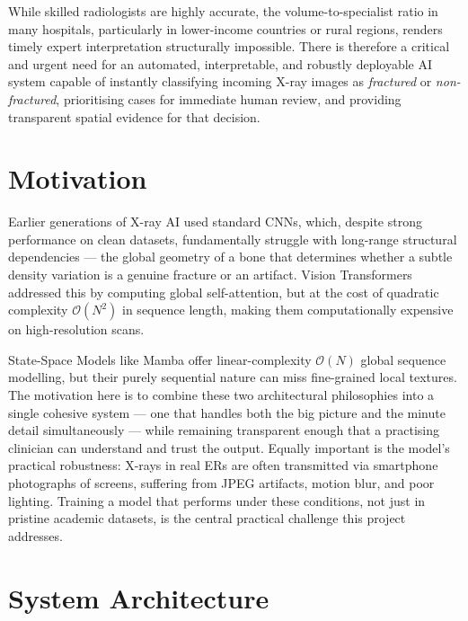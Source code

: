 \documentclass[12pt, a4paper]{article}
\begin{document}
While skilled radiologists are highly accurate, the volume-to-specialist ratio in many hospitals,
particularly in lower-income countries or rural regions, renders timely expert interpretation
structurally impossible. There is therefore a critical and urgent need for an automated,
interpretable, and robustly deployable AI system capable of instantly classifying incoming X-ray
images as \emph{fractured} or \emph{non-fractured}, prioritising cases for immediate human
review, and providing transparent spatial evidence for that decision.

\section{Motivation}

Earlier generations of X-ray AI used standard CNNs, which, despite strong performance on clean
datasets, fundamentally struggle with long-range structural dependencies — the global geometry of
a bone that determines whether a subtle density variation is a genuine fracture or an artifact.
Vision Transformers addressed this by computing global self-attention, but at the cost of
quadratic complexity $\mathcal{O}(N^2)$ in sequence length, making them computationally expensive
on high-resolution scans.

State-Space Models like Mamba offer linear-complexity $\mathcal{O}(N)$ global sequence modelling,
but their purely sequential nature can miss fine-grained local textures. The motivation here is to
combine these two architectural philosophies into a single cohesive system — one that handles both
the big picture and the minute detail simultaneously — while remaining transparent enough that a
practising clinician can understand and trust the output. Equally important is the model's
practical robustness: X-rays in real ERs are often transmitted via smartphone photographs of
screens, suffering from JPEG artifacts, motion blur, and poor lighting. Training a model that
performs under these conditions, not just in pristine academic datasets, is the central practical
challenge this project addresses.

\section{System Architecture}
\end{document}

